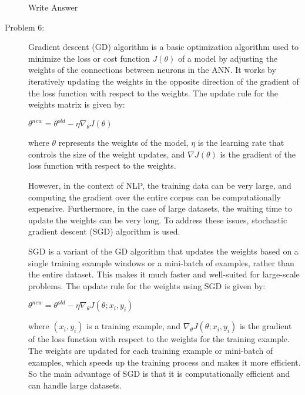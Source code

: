 \documentclass[12pt]{article}
\begin{document}
\begin{description}
  Write Answer

  \pagebreak

  \item[Problem 6:] \hfill %
  
  Gradient descent (GD) algorithm is a basic optimization algorithm used to minimize the loss or cost function $J(\theta)$ of a model by adjusting the weights of the connections between neurons in the ANN.
  It works by iteratively updating the weights in the opposite direction of the gradient of the loss function with respect to the weights. The update rule for the weights matrix is given by:

  \begin{center}
    $\displaystyle{\theta^{new} = \theta^{old} - \eta \nabla_{\theta} J(\theta)}$
  \end{center}
  
  where $\theta$ represents the weights of the model, $\eta$ is the learning rate that controls the size of the weight updates, and $\nabla J(\theta)$ is the gradient of the 
  loss function with respect to the weights.

  However, in the context of NLP, the training data can be very large, and computing the gradient over the entire corpus can be computationally expensive. Furthermore, 
  in the case of large datasets, the waiting time to update the weights can be very long. To address these issues, stochastic gradient descent (SGD) algorithm is used.

  SGD is a variant of the GD algorithm that updates the weights based on a single training example windows or a mini-batch of examples, rather than the entire dataset. This makes it 
  much faster and well-suited for large-scale problems. The update rule for the weights using SGD is given by:

  \begin{center}
    $\displaystyle{\theta^{new} = \theta^{old} - \eta \nabla_{\theta} J(\theta; x_i, y_i)}$
  \end{center}

  where $(x_i, y_i)$ is a training example, and $\nabla_{\theta} J(\theta; x_i, y_i)$ is the gradient of the loss function with respect to the weights for the training example.
  The weights are updated for each training example or mini-batch of examples, which speeds up the training process and makes it more efficient. So the main advantage of SGD 
  is that it is computationally efficient and can handle large datasets.


\end{description}
\end{document}
